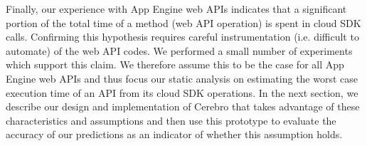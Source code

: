 Finally, our experience with App Engine web APIs indicates that a significant
portion of the total time of a method (web API operation) is spent in cloud SDK calls.
Confirming this hypothesis requires careful instrumentation (i.e. difficult
to automate) of the web API codes.  We performed a small number of experiments 
which support this claim.  We therefore assume this to be the case for all
App Engine web APIs and thus focus our static analysis on estimating the 
worst case execution time of an API from its cloud SDK operations.
In the next section, we describe our design and implementation of Cerebro
that takes advantage of these characteristics and assumptions and then
use this prototype to evaluate the accuracy of our predictions as an indicator
of whether this assumption holds.
